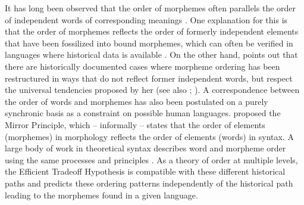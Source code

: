 \documentclass[11pt,letterpaper]{article}
\newcommand{\citep}{\parencite}
\newcommand{\citet}{\Textcite}
\newcommand\mhahn[1]{{\color{red}(#1)}}
\begin{document}
It has long been observed that the order of morphemes often parallels the order of independent words of corresponding meanings \citep{givon1971historical,venneman1973explanation,baker1985the}.
One explanation for this is that the order of morphemes reflects the order of formerly independent elements that have been fossilized into bound morphemes, which can often be verified in languages where historical data is available \citep{givon1971historical,venneman1973explanation}.
On the other hand, \citet{bybee-morphology-1985} points out that there are historically documented cases where morpheme ordering has been restructured in ways that do not reflect former independent words, but respect the universal tendencies proposed by her (see also \citet{mithun2000the, haspelmath1993the, mithun1995affixation}; \citet[Section 15]{rice2000morpheme}).
A correspondence between the order of words and morphemes has also been postulated on a purely synchronic basis as a constraint on possible human languages.
\cite{baker1985the} proposed the Mirror Principle, which -- informally -- states that the order of elements (morphemes) in morphology reflects the order of elements (words) in syntax.
A large body of work in theoretical syntax describes word and morpheme order using the same processes and principles \citep{halle1993distributed}.
As a theory of order at multiple levels, the Efficient Tradeoff Hypothesis is compatible with these different historical paths and predicts these ordering patterns independently of the historical path leading to the morphemes found in a given language.






\end{document}
